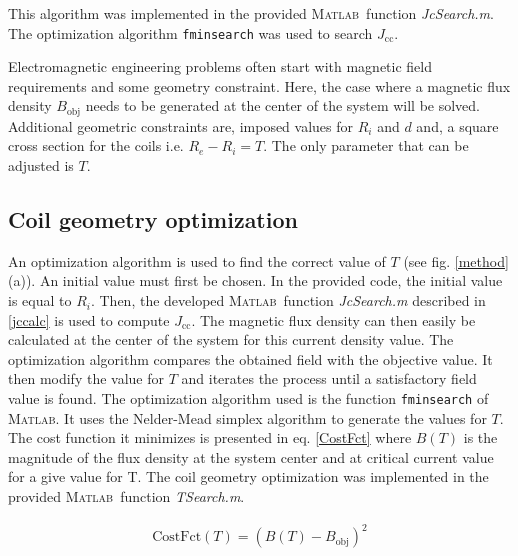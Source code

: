 \documentclass{ws-jmrr}
\newcommand{\MATLAB}{\textsc{Matlab}}
\begin{document}
\begin{multicols}{2}
This algorithm was implemented in the provided \MATLAB ~function \emph{JcSearch.m}. The optimization algorithm \texttt{fminsearch} was used to search $J_{\textrm{cc}}$.\par
Electromagnetic engineering problems often start with magnetic field requirements and some geometry constraint. Here, the case where a magnetic flux density $B_{\textrm{obj}}$ needs to be generated at the center of the system will be solved. Additional geometric constraints are, imposed values for $R_i$ and $d$ and, a square cross section for the coils i.e. $R_e-R_i=T$. The only parameter that can be adjusted is $T$.\par

\subsection{Coil geometry optimization}
An optimization algorithm is used to find the correct value of $T$ (see fig. \ref{method} (a)). An initial value must first be chosen. In the provided code, the initial value is equal to $R_i$. Then, the developed \MATLAB ~function \emph{JcSearch.m} described in \ref{jccalc} is used to compute $J_{\textrm{cc}}$. The magnetic flux density can then easily be calculated at the center of the system for this current density value. The optimization algorithm compares the obtained field with the objective value. It then modify the value for $T$ and iterates the process until a satisfactory field value is found. The optimization algorithm used is the function \texttt{fminsearch} of \MATLAB. It uses the Nelder-Mead simplex algorithm \cite{lagarias1998convergence} to generate the values for $T$. The cost function it minimizes is presented in eq. \ref{CostFct} where $B(T)$ is the magnitude of the flux density at the system center and at critical current value for a give value for T. The coil geometry optimization was implemented in the provided \MATLAB ~function \emph{TSearch.m}.

\begin{align}
\textrm{CostFct}(T)=\left ( B(T)-B_{\textrm{obj}} \right )^{2}
\label{CostFct}
\end{align}


\end{multicols}
\end{document}
